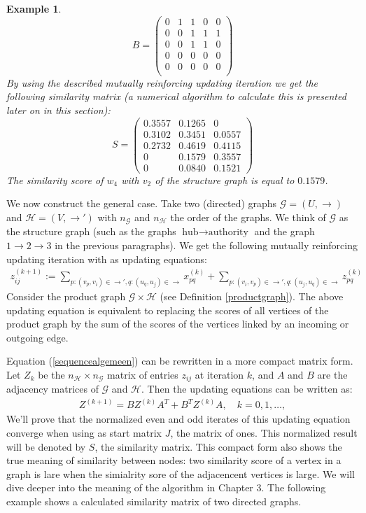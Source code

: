 \documentclass[a4paper,11pt]{report}
\newtheorem{example}[theorem]{Example}
\newcommand{\graf}{\mathscr{G}}
\newcommand{\grafeen}{\mathscr{H}}
\begin{document}
\begin{example}
$$B = \begin{pmatrix}
0 & 1 & 1 & 0 & 0\\
0 & 0 & 1 & 1 & 1\\
0 & 0 & 1 & 1 & 0\\
0 & 0 & 0 & 0 & 0\\
0 & 0 & 0 & 0 & 0\\
\end{pmatrix}$$
 By using the described mutually reinforcing updating iteration we get the 
 following similarity matrix (a numerical algorithm to calculate this is presented later 
 on in this section):
 $$ S = \begin{pmatrix}
 0.3557 & 0.1265 & 0\\
 0.3102 & 0.3451  & 0.0557\\
 0.2732 & 0.4619 & 0.4115\\
0 & 0.1579 & 0.3557\\
 0 & 0.0840 & 0.1521
\end{pmatrix}$$
The similarity score of $w_4$ with $v_2$ of the structure graph is equal to 
$0.1579$.
 \end{example}

 We now construct the general case. Take two (directed) graphs $\graf=(U, \to)$ and $\grafeen=(V, \to')$ 
 with $n_\graf$ and $n_\grafeen$ the order of the graphs. We think of $\graf$ as the structure 
 graph (such as the graphs $\text{hub}\to \text{authority}$ and the graph $1\to 2\to 
 3$ in the previous paragraphs). We get the following mutually reinforcing updating iteration with as updating equations:
 \begin{eqnarray}\label{vergblondel}
 z^{(k+1)}_{ij} := \sum_{p:(v_p,v_i)\in \to', q:(u_q,u_j) \in \to} x^{(k)}_{pq} +  \sum_{p:(v_i,v_p)\in \to', q:(u_j,u_q) \in \to} z^{(k)}_{pq} 
 \end{eqnarray}
 Consider the product graph $\graf \times \grafeen$ (see Definition \ref{productgraph}). The above updating equation is equivalent to replacing
 the scores of all vertices of the product graph by the sum of the scores of the vertices linked by an incoming
 or outgoing edge. 
 
 Equation (\ref{sequencealgemeen}) can be rewritten in a more compact matrix form. Let $Z_k$
 be the $n_\grafeen \times n_\graf$ matrix of entries $z_{ij}$ at iteration $k$, and $A$ and $B$ are the adjacency matrices
 of $\graf$ and $\grafeen$. Then the 
 updating equations can be written as:
 \begin{eqnarray}\label{compacteforms}
Z^{(k+1)} = BZ^{(k)}A^T + B^TZ^{(k)}A,\quad k=0,1,\ldots,
  \end{eqnarray}
We'll prove that the normalized even and odd iterates of 
 this updating equation converge when using as start matrix $J$, the matrix of ones. This normalized
result will be denoted by $S$,  the similarity matrix. This compact form also shows the true meaning of similarity between nodes:
two similarity score of a vertex in a graph is lare when the simialrity sore of the adjacencent vertices is large. We will dive deeper into
the meaning of the algorithm in Chapter 3. The following example shows a calculated similarity 
 matrix of two directed graphs.
 
\end{document}
